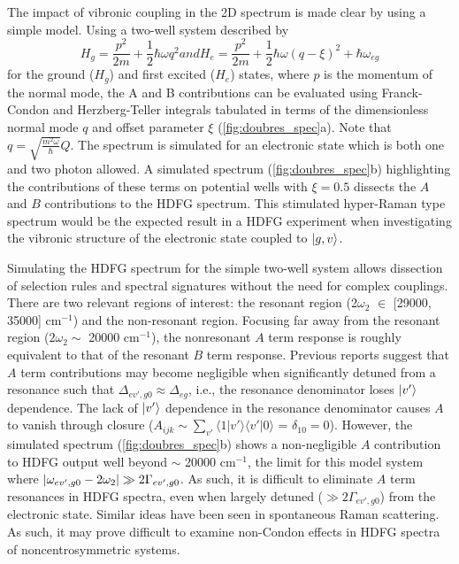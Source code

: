 \documentclass[aip, jcp, reprint, onecolumn]{revtex4-2}
\begin{document}
The impact of vibronic coupling in the 2D spectrum is made clear by using a simple model. \cite{Kundu2022}
Using a two-well system described by 
\begin{subequations}
	\begin{equation}
		H_g = \frac{p^2}{2m} + \frac{1}{2} \hbar \omega q^2
	\end{equation}
and
	\begin{equation}
		H_e = \frac{p^2}{2m} + \frac{1}{2} \hbar \omega (q-\xi)^2 +\hbar \omega_{eg}
	\end{equation}
\end{subequations}
for the ground ($H_g$) and first excited ($H_e$) states, where $p$ is the momentum of the normal mode, the A and B contributions can be evaluated using Franck-Condon and Herzberg-Teller integrals tabulated in terms of the dimensionless normal mode $q$ and offset parameter $\xi$ (\autoref{fig:doubres_spec}a). \cite{Carlson1988thesis} 
Note that $q = \sqrt{\frac{m^2\omega}{\hbar}} Q$.
The spectrum is simulated for an electronic state which is both one and two photon allowed.
A simulated spectrum (\autoref{fig:doubres_spec}b) highlighting the contributions of these terms on potential wells with $\xi = 0.5$ dissects the $A$ and $B$ contributions to the HDFG spectrum.
This stimulated hyper-Raman type spectrum would be the expected result in a HDFG experiment when investigating the vibronic structure of the electronic state coupled to $\ket{g,v}$.

Simulating the HDFG spectrum for the simple two-well system allows dissection of selection rules and spectral signatures without the need for complex couplings.
There are two relevant regions of interest: the resonant region (2$\omega_2$ $\in$ [29000, 35000] cm$^{-1}$) and the non-resonant region.
Focusing far away from the resonant region ($2\omega_2 \sim$ 20000 cm$^{-1}$), the nonresonant $A$ term response is roughly equivalent to that of the resonant $B$ term response. 
Previous reports suggest that $A$ term contributions may become negligible when significantly detuned from a resonance such that $\Delta_{ev', g0} \approx \Delta_{eg}$, i.e., the resonance denominator loses $\ket{v'}$ dependence. \cite{Neddersen1989}
The lack of $\ket{v'}$ dependence in the resonance denominator causes $A$ to vanish through closure ($A_{ijk} \sim \sum_{v'} \langle 1|v' \rangle \langle v'|0\rangle$ = $\delta_{10} = 0$).
However, the simulated spectrum (\autoref{fig:doubres_spec}b) shows a non-negligible $A$ contribution to HDFG output well beyond $\sim$ 20000 cm$^{-1}$, the limit for this model system where $\abs{\omega_{ev',g0} - 2\omega_2} \gg 2\Gamma_{ev',g0}$.
As such, it is difficult to eliminate $A$ term resonances in HDFG spectra, even when largely detuned ($\gg 2\Gamma_{ev',g0}$) from the electronic state. 
Similar ideas have been seen in spontaneous Raman scattering. \cite{Li1990, Gong2015}
As such, it may prove difficult to examine non-Condon effects in HDFG spectra of noncentrosymmetric systems. 
\end{document}
